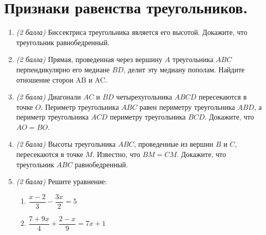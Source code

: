 \documentclass[12pt, a4paper]{article}
\begin{document}
		

\section*{Признаки равенства треугольников.}
\begin{enumerate}
	\item \textit{(2 балла)} Биссектриса треугольника является его высотой. Докажите, что треугольник равнобедренный.
	\item \textit{(2 балла)} Прямая, проведенная через вершину $A$ треугольника $ABC$ перпендикулярно его медиане $BD$, делит эту медиану
	пополам. Найдите отношение сторон AB и AC.
	\item \textit{(2 балла)} Диагонали $AC$ и $BD$ четырехугольника $ABCD$ пересекаются в точке $O$. Периметр треугольника $ABC$ равен периметру треугольника $ABD$, а периметр треугольника $ACD$ периметру треугольника $BCD$. Докажите, что $AO = BO$.
	\item \textit{(2 балла)} Высоты треугольника $ABC$, проведенные из вершин $B$
	и $C$, пересекаются в точке $M$. Известно, что $BM = CM$. Докажите, что треугольник $ABC$ равнобедренный.
	\item \textit{(2 балла)} Решите уравнение:
	\begin{multicols}{2}
		\begin{enumerate}[label=\asbuk*)]
			\item $\dfrac{x-2}{3} - \dfrac{3x}{2} = 5$
			\item $\dfrac{7+9x}{4}+\dfrac{2-x}{9}=7x+1$
		\end{enumerate}
	\end{multicols}
\end{enumerate}
\end{document}
